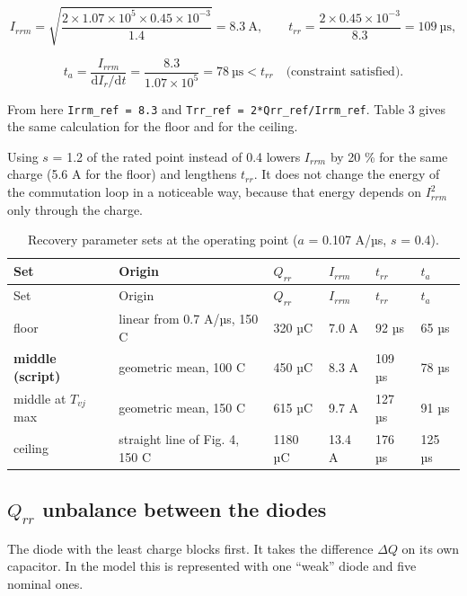 \documentclass[11pt,a4paper,numbers=noenddot]{scrartcl}
\begin{document}
\begin{onehalfspace}
\[I_{rrm} = \sqrt{\frac{2 \times 1.07 \times 10^5 \times 0.45 \times 10^{-3}}{1.4}} = 8.3\ \text{A}, \qquad t_{rr} = \frac{2 \times 0.45 \times 10^{-3}}{8.3} = 109\ \text{µs},\]

\[t_a = \frac{I_{rrm}}{\mathrm{d}I_r/\mathrm{d}t} = \frac{8.3}{1.07 \times 10^5} = 78\ \text{µs} < t_{rr}\quad \text{(constraint satisfied)}.\]

From here \texttt{Irrm\_ref\ =\ 8.3} and \texttt{Trr\_\allowbreak{}ref\ =\ 2*Qrr\_\allowbreak{}ref/\allowbreak{}Irrm\_\allowbreak{}ref}. Table 3 gives the same calculation for the floor and for the ceiling.

Using \(s\) = 1.2 of the rated point instead of 0.4 lowers \(I_{rrm}\) by 20 \% for the same charge (5.6 A for the floor) and lengthens \(t_{rr}\). It does not change the energy of the commutation loop in a noticeable way, because that energy depends on \(I_{rrm}^2\) only through the charge.

{\small\singlespacing
\begin{longtable}[]{@{}llllll@{}}
\caption{Recovery parameter sets at the operating point (\(a\) = 0.107 A/µs, \(s\) = 0.4).}\tabularnewline
\toprule\noalign{}
Set & Origin & \(Q_{rr}\) & \(I_{rrm}\) & \(t_{rr}\) & \(t_a\) \\
\midrule\noalign{}
\endfirsthead
\toprule\noalign{}
Set & Origin & \(Q_{rr}\) & \(I_{rrm}\) & \(t_{rr}\) & \(t_a\) \\
\midrule\noalign{}
\endhead
\bottomrule\noalign{}
\endlastfoot
floor & linear from 0.7 A/µs, 150 \textdegree{}C & 320 µC & 7.0 A & 92 µs & 65 µs \\
\textbf{middle (script)} & geometric mean, 100 \textdegree{}C & 450 µC & 8.3 A & 109 µs & 78 µs \\
middle at \(T_{vj}\) max & geometric mean, 150 \textdegree{}C & 615 µC & 9.7 A & 127 µs & 91 µs \\
ceiling & straight line of Fig. 4, 150 \textdegree{}C & 1180 µC & 13.4 A & 176 µs & 125 µs \\
\end{longtable}
}

\subsection{\texorpdfstring{\(Q_{rr}\) unbalance between the diodes}{Q\_\{rr\} unbalance between the diodes}}\label{q_rr-unbalance-between-the-diodes}

The diode with the least charge blocks first. It takes the difference \(\Delta Q\) on its own capacitor. In the model this is represented with one ``weak'' diode and five nominal ones.


\end{onehalfspace}
\end{document}
